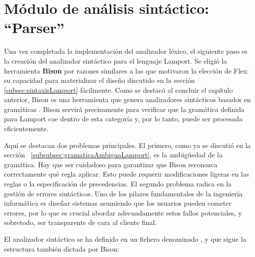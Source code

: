 \section{Módulo de análisis sintáctico: ``Parser''}\label{sec:implementacionParser}
Una vez completada la implementación del analizador léxico, el siguiente paso es la creación del analizador sintáctico para el lenguaje Lamport. Se eligió la herramienta \textbf{Bison} por razones similares a las que motivaron la elección de Flex: su capacidad para materializar el diseño discutido en la sección \ref{subsec:sintaxisLamport} fácilmente. Como se destacó al concluir el capítulo anterior, Bison es una herramienta que genera analizadores sintácticos basados en gramáticas . Bison servirá precisamente para verificar que la gramática definida para Lamport cae dentro de esta categoría y, por lo tanto, puede ser procesada eficientemente.

\vspace{0.5cm}

Aquí se destacan dos problemas principales. El primero, como ya se discutió en la sección ~\ref{subsubsec:gramaticaAmbiguaLamport}, es la ambigüedad de la gramática. Hay que ser cuidadoso para garantizar que Bison reconozca correctamente qué regla aplicar. Esto puede requerir modificaciones ligeras en las reglas o la especificación de precedencias. El segundo problema radica en la gestión de errores sintácticos. Uno de los pilares fundamentales de la ingeniería informática es diseñar sistemas asumiendo que los usuarios pueden cometer errores, por lo que es crucial abordar adecuadamente estos fallos potenciales, y sobretodo, ser transparente de cara al cliente final.

\vspace{0.5cm}

El analizador sintáctico se ha definido en un fichero denominado , y que sigue la estructura también dictada por Bison:

